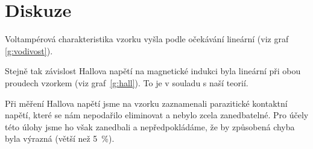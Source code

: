 \section*{Diskuze}
Voltampérová charakteristika vzorku vyšla podle očekávání lineární (viz graf \ref{g:vodivost}).

Stejně tak závislost Hallova napětí na magnetické indukci byla lineární při obou proudech vzorkem (viz graf~\ref{g:hall}). To je v souladu s naší teorií.


Při měření Hallova napětí jsme na vzorku zaznamenali parazitické kontaktní napětí, které se nám nepodařilo eliminovat a nebylo zcela zanedbatelné. Pro účely této úlohy jsme ho však zanedbali a nepředpokládáme, že by způsobená chyba byla výrazná (větší než \SI{5}{\percent}).